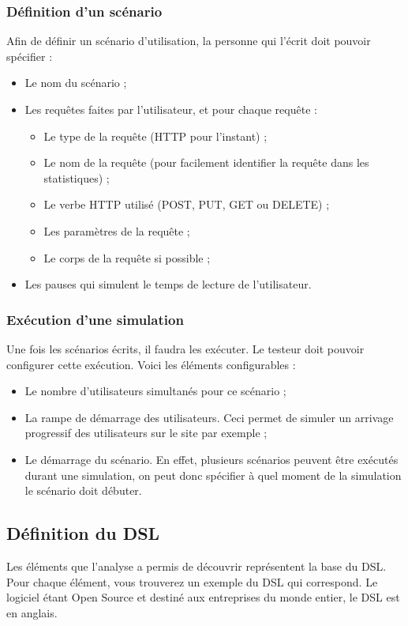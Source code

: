 \subsubsection{Définition d'un scénario}
Afin de définir un scénario d'utilisation, la personne qui l'écrit doit pouvoir spécifier :
\begin{itemize}
  \item Le nom du scénario ;
  \item Les requêtes faites par l'utilisateur, et pour chaque requête :
  \begin{itemize}
    \item Le type de la requête (HTTP pour l'instant) ;
	\item Le nom de la requête (pour facilement identifier la requête dans les statistiques) ;
    \item Le verbe HTTP utilisé (POST, PUT, GET ou DELETE) ;
    \item Les paramètres de la requête ;
    \item Le corps de la requête si possible ;
  \end{itemize}
  \item Les pauses qui simulent le temps de lecture de l'utilisateur.
\end{itemize}

\subsubsection{Exécution d'une simulation}
Une fois les scénarios écrits, il faudra les exécuter. Le testeur doit pouvoir configurer cette exécution. Voici les éléments configurables :
\begin{itemize}
  \item Le nombre d'utilisateurs simultanés pour ce scénario ;
  \item La rampe de démarrage des utilisateurs. Ceci permet de simuler un arrivage progressif des utilisateurs sur le site par exemple ;
  \item Le démarrage du scénario. En effet, plusieurs scénarios peuvent être exécutés durant une simulation, on peut donc spécifier à quel moment de la simulation le scénario doit débuter.
\end{itemize}

\subsection{Définition du DSL}
Les éléments que l'analyse a permis de découvrir représentent la base du DSL. Pour chaque élément, vous trouverez un exemple du DSL qui correspond. Le logiciel étant Open Source et destiné aux entreprises du monde entier, le DSL est en anglais.

